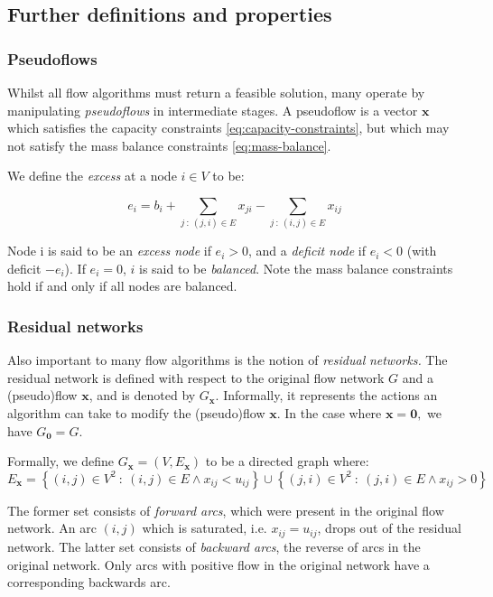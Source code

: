 \subsection{Further definitions and properties}

\subsubsection{Pseudoflows} \label{sec:prep-flow-pseudo}

Whilst all flow algorithms must return a feasible solution, many operate
by manipulating \emph{pseudoflows} in intermediate stages. A pseudoflow
is a vector $\mathbf{x}$ which satisfies the capacity constraints
\cref{eq:capacity-constraints}, but which may not satisfy the mass balance constraints \cref{eq:mass-balance}.

We define the \emph{excess} at a node $i\in V$ to be:

\begin{equation}
e_{i}=b_{i}+\sum_{j\::\:(j,i)\in E}x_{ji}-\sum_{j\::\:(i,j)\in E}x_{ij}
\end{equation}

Node i is said to be an \emph{excess node} if $e_{i}>0$, and a \emph{deficit
	node} if $e_{i}<0$ (with deficit $-e_{i}$). If $e_{i}=0$, $i$
is said to be \emph{balanced}. Note the mass balance constraints hold if and
only if all nodes are balanced.

\subsubsection{Residual networks}

Also important to many flow algorithms is the notion of \emph{residual}
\emph{networks. }The residual network is defined with respect to the
original flow network $G$ and a (pseudo)flow $\mathbf{x}$, and is
denoted by $G_{\mathbf{x}}$. Informally, it represents the actions
an algorithm can take to modify the (pseudo)flow $\mathbf{x}$. In
the case where $\mathbf{x=0},$ we have $G_{\mathbf{0}}=G$.

Formally, we define $G_{\mathbf{x}}=\left(V,E_{\mathbf{x}}\right)$
to be a directed graph where:
\begin{equation}
E_{\mathbf{x}}=\left\{ (i,j)\in V^{2}\::\:(i,j)\in E\land x_{ij}<u_{ij}\right\} \cup\left\{ (j,i)\in V^{2}\::\:(j,i)\in E\land x_{ij}>0\right\} 
\end{equation}


The former set consists of \emph{forward arcs}, which were present
in the original flow network. An arc $(i,j)$ which is saturated,
i.e. $x_{ij}=u_{ij}$, drops out of the residual network. The latter
set consists of \emph{backward arcs}, the reverse of arcs in the original
network. Only arcs with positive flow in the original network have
a corresponding backwards arc.

